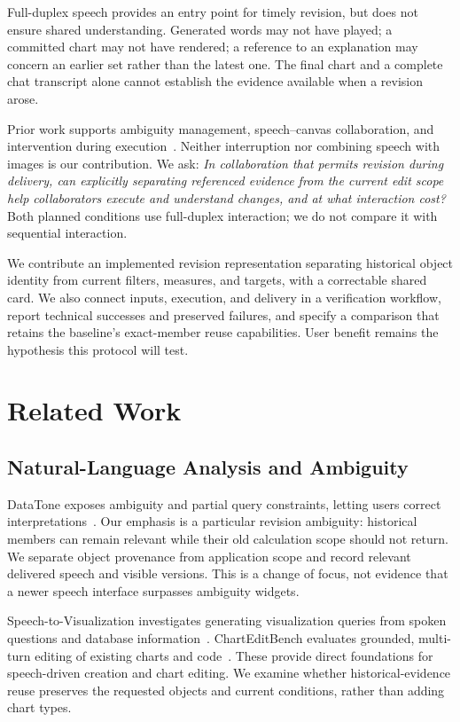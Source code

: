 \documentclass[conference,10pt,letterpaper]{IEEEtran}
\begin{document}
Full-duplex speech provides an entry point for timely revision, but does not ensure shared understanding. Generated words may not have played; a committed chart may not have rendered; a reference to an explanation may concern an earlier set rather than the latest one. The final chart and a complete chat transcript alone cannot establish the evidence available when a revision arose.

Prior work supports ambiguity management, speech--canvas collaboration, and intervention during execution~\cite{datatone,cleo,voca}. Neither interruption nor combining speech with images is our contribution. We ask: \emph{In collaboration that permits revision during delivery, can explicitly separating referenced evidence from the current edit scope help collaborators execute and understand changes, and at what interaction cost?} Both planned conditions use full-duplex interaction; we do not compare it with sequential interaction.

We contribute an implemented revision representation separating historical object identity from current filters, measures, and targets, with a correctable shared card. We also connect inputs, execution, and delivery in a verification workflow, report technical successes and preserved failures, and specify a comparison that retains the baseline's exact-member reuse capabilities. User benefit remains the hypothesis this protocol will test.

\section{Related Work}
\subsection{Natural-Language Analysis and Ambiguity}
DataTone exposes ambiguity and partial query constraints, letting users correct interpretations~\cite{datatone}. Our emphasis is a particular revision ambiguity: historical members can remain relevant while their old calculation scope should not return. We separate object provenance from application scope and record relevant delivered speech and visible versions. This is a change of focus, not evidence that a newer speech interface surpasses ambiguity widgets.

Speech-to-Visualization investigates generating visualization queries from spoken questions and database information~\cite{speechvis}. ChartEditBench evaluates grounded, multi-turn editing of existing charts and code~\cite{charteditbench}. These provide direct foundations for speech-driven creation and chart editing. We examine whether historical-evidence reuse preserves the requested objects and current conditions, rather than adding chart types.
\end{document}
